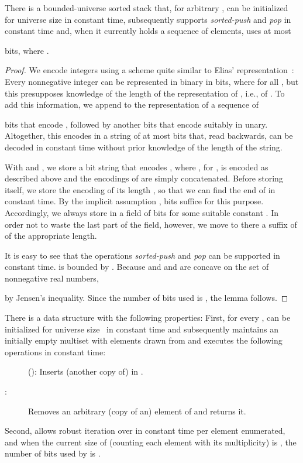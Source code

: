 \documentclass[envcountsame,envcountsect,undated,nolinenumbers]{lnthi}
\def\Tvn#1{\hbox{\textit{#1\/}}}
\begin{document}
\begin{lemma}
\label{lem:stack}There is a bounded-universe
sorted stack that, for arbitrary ,
can be initialized for universe size  in constant time,
subsequently
supports \Tvn{sorted-push} and \Tvn{pop} in constant
time and, when it currently holds a sequence
 of  elements, uses at most

bits, where . 
\end{lemma}

\begin{proof}
We encode integers using a scheme quite similar
to Elias'  representation~\cite{Eli75}:
Every nonnegative integer  can be represented in binary
in  bits, where
 for all ,
but this presupposes knowledge of the length of
the representation of , i.e., of .
To add this information, we append to the
representation of  a sequence of

bits that encode , followed by another
 bits that encode  suitably in unary.
Altogether, this encodes  in a string of
at most  bits that,
read backwards, can be decoded in constant time without prior
knowledge of the length of the string.

With  and ,
we store a bit string  that encodes
, where
, for ,
is encoded as described above
and the encodings of 
are simply concatenated.
Before storing  itself, we store the
encoding of its length
, so that we can find the end of  in
constant time.
By the implicit assumption ,
 bits suffice for this purpose.
Accordingly, we always store  in a field of  bits
for some suitable constant .
In order not to waste the last part of the field,
however, we move to there a suffix of  of
the appropriate length.

It is easy to see that the operations
\Tvn{sorted-push} and \Tvn{pop} can
be supported in constant time.
 is bounded by
.
Because  and
 and  are concave
on the set of nonnegative real numbers,

by Jensen's inequality.
Since the number of bits used is
, the lemma follows.
\end{proof}

\begin{theorem}
\label{thm:mlog}There is a data structure  with the following
properties:
First, for every ,  can
be initialized for universe size~
in constant time and subsequently maintains
an initially empty multiset  with elements drawn from
 and executes the following
operations in constant time:

\begin{description}
\item[\normalfont]
(): Inserts (another copy of)  in .
\item[\normalfont:]
Removes an arbitrary (copy of an) element of 
and returns it.
\end{description}

\noindent
Second,  allows robust iteration over 
in constant time per element enumerated,
and when the current size of 
(counting each element with its multiplicity) is ,
the number of bits used by  is
.
\end{theorem}
\end{document}
